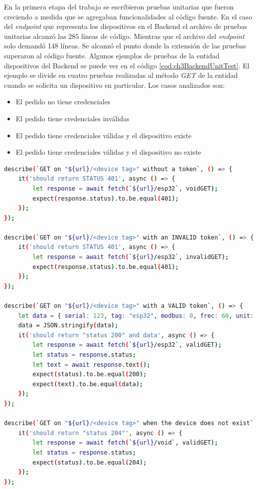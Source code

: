 En la primera etapa del trabajo se escribieron pruebas unitarias que fueron creciendo a medida que se agregaban funcionalidades al código fuente.
En el caso del \emph{endpoint} que representa los dispositivos en el Backend el archivo de pruebas unitarias alcanzó las 285 líneas de código.
Mientras que el archivo del \emph{endpoint} solo demandó 148 líneas.
Se alcanzó el punto donde la extensión de las pruebas superaron al código fuente.
Algunos ejemplos de pruebas de la entidad dispositivos del Backend se puede ver en el código \ref{cod:ch3BackendUnitTest}.
El ejemplo se divide en cuatro pruebas realizadas al método \emph{GET} de la entidad cuando se solicita un dispositivo en particular.
Los casos analizados son:

\begin{itemize}
	\item El pedido no tiene credenciales
	\item El pedido tiene credenciales inválidas
	\item El pedido tiene credenciales válidas y el dispositivo existe
	\item El pedido tiene credenciales válidas y el dispositivo no existe
\end{itemize}

\begin{lstlisting}[language=bash,label=cod:ch3BackendUnitTest,caption=Extracto de prueba unitaria Backend.]
describe(`GET on "${url}/<device tag>" without a token`, () => {
    it('should return STATUS 401', async () => {
        let response = await fetch(`${url}/esp32`, voidGET);
        expect(response.status).to.be.equal(401);
    });
});

describe(`GET on "${url}/<device tag>" with an INVALID token`, () => {
    it('should return STATUS 401', async () => {
        let response = await fetch(`${url}/esp32`, invalidGET);
        expect(response.status).to.be.equal(401);
    });
});

describe(`GET on "${url}/<device tag>" with a VALID token`, () => {
    let data = { serial: 123, tag: "esp32", modbus: 0, frec: 60, unit: "t" };
    data = JSON.stringify(data);
    it('should return "status 200" and data', async () => {
        let response = await fetch(`${url}/esp32`, validGET);
        let status = response.status;
        let text = await response.text();
        expect(status).to.be.equal(200);
        expect(text).to.be.equal(data);
    });
});

describe(`GET on "${url}/<device tag>" when the device does not exist`, () => {
    it('should return "status 204"', async () => {
        let response = await fetch(`${url}/void`, validGET);
        let status = response.status;
        expect(status).to.be.equal(204);
    });
});
\end{lstlisting}

